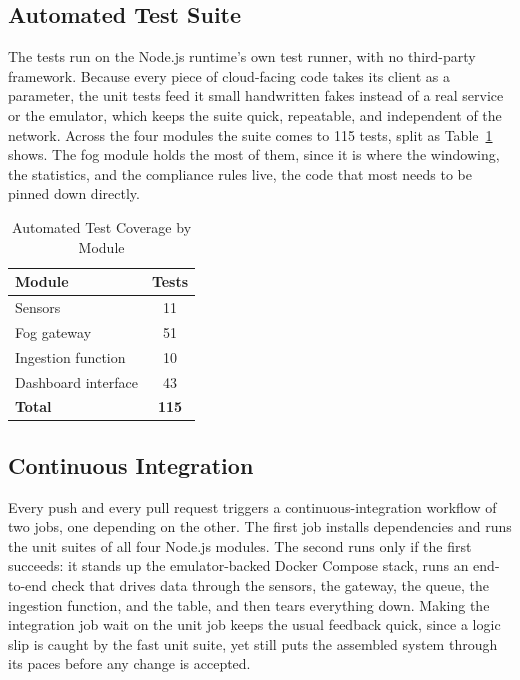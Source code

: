 \documentclass[conference]{IEEEtran}
\begin{document}
\subsection{Automated Test Suite}

The tests run on the Node.js runtime's own test runner, with no third-party framework. Because every piece of cloud-facing code takes its client as a parameter, the unit tests feed it small handwritten fakes instead of a real service or the emulator, which keeps the suite quick, repeatable, and independent of the network. Across the four modules the suite comes to 115 tests, split as Table~\ref{tab:tests} shows. The fog module holds the most of them, since it is where the windowing, the statistics, and the compliance rules live, the code that most needs to be pinned down directly.

\begin{table}[!t]
\caption{Automated Test Coverage by Module}
\label{tab:tests}
\centering
\renewcommand{\arraystretch}{1.3}
\begin{tabular}{@{}lc@{}}
\toprule
\textbf{Module} & \textbf{Tests} \\
\midrule
Sensors & 11 \\
Fog gateway & 51 \\
Ingestion function & 10 \\
Dashboard interface & 43 \\
\midrule
\textbf{Total} & \textbf{115} \\
\bottomrule
\end{tabular}
\end{table}

\subsection{Continuous Integration}

Every push and every pull request triggers a continuous-integration workflow of two jobs, one depending on the other. The first job installs dependencies and runs the unit suites of all four Node.js modules. The second runs only if the first succeeds: it stands up the emulator-backed Docker Compose stack, runs an end-to-end check that drives data through the sensors, the gateway, the queue, the ingestion function, and the table, and then tears everything down. Making the integration job wait on the unit job keeps the usual feedback quick, since a logic slip is caught by the fast unit suite, yet still puts the assembled system through its paces before any change is accepted.
\end{document}
